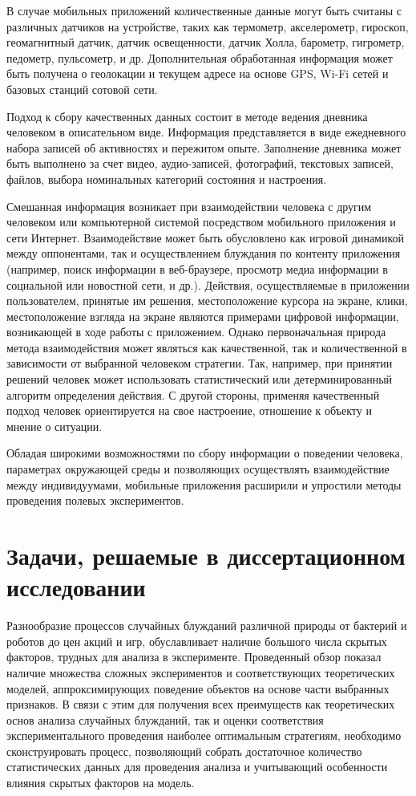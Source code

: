 В случае мобильных приложений количественные данные могут быть считаны с различных датчиков на устройстве, таких как термометр, акселерометр,
гироскоп, геомагнитный датчик, датчик освещенности, датчик Холла, барометр, гигрометр, педометр, пульсометр, и др. 
Дополнительная обработанная информация может быть получена о геолокации и текущем адресе на основе GPS, Wi-Fi сетей и базовых станций сотовой сети.

Подход к сбору качественных данных состоит в методе ведения дневника человеком в описательном виде. 
Информация представляется в виде ежедневного набора записей об активностях и пережитом опыте.
Заполнение дневника может быть выполнено за счет видео, аудио-записей, фотографий, текстовых записей, файлов, 
выбора номинальных категорий состояния и настроения.

Смешанная информация возникает при взаимодействии человека с другим человеком или компьютерной системой посредством мобильного приложения и сети Интернет.
Взаимодействие может быть обусловлено как игровой динамикой между оппонентами, так и осуществлением блуждания по контенту приложения
(например, поиск информации в веб-браузере, просмотр медиа информации в социальной или новостной сети, и др.).
Действия, осуществляемые в приложении пользователем, принятые им решения, местоположение курсора на экране, клики,
местоположение взгляда на экране являются примерами цифровой информации, возникающей в ходе работы с приложением.
Однако первоначальная природа метода взаимодействия может являться как качественной, так и количественной в зависимости от выбранной человеком стратегии.
Так, например, при принятии решений человек может использовать статистический или детерминированный алгоритм определения действия.
С другой стороны, применяя качественный подход человек ориентируется на свое настроение, отношение к объекту и мнение о ситуации.

Обладая широкими возможностями по сбору информации о поведении человека, параметрах окружающей среды и позволяющих осуществлять
взаимодействие между индивидуумами, мобильные приложения расширили и упростили методы проведения полевых экспериментов.


\section{Задачи, решаемые в диссертационном исследовании}\label{sec:ch1/sec4}

Разнообразие процессов случайных блужданий различной природы от бактерий и роботов до 
цен акций и игр, обуславливает наличие большого числа скрытых факторов, трудных для анализа в эксперименте.
Проведенный обзор показал наличие множества сложных экспериментов и соответствующих теоретических моделей,
аппроксимирующих поведение объектов на основе части выбранных признаков. В связи с этим для получения
всех преимуществ как теоретических основ анализа случайных блужданий, так и оценки соответствия экспериментального проведения
наиболее оптимальным стратегиям, необходимо сконструировать процесс, позволяющий собрать достаточное количество 
статистических данных для проведения анализа и учитывающий особенности влияния скрытых факторов на модель.

